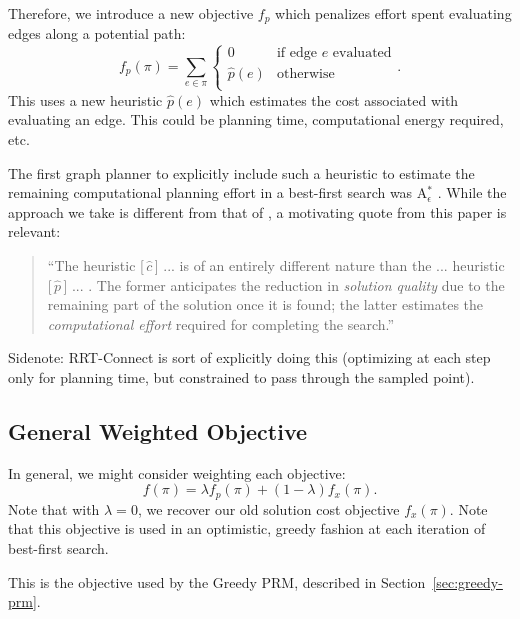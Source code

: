 \documentclass{report}
\begin{document}
Therefore, we introduce a new objective $f_p$
which penalizes effort spent evaluating edges along a potential path:
\begin{equation}
   f_p(\pi) = \sum_{e \in \pi} \left\{
   \begin{array}{cl}
      0 & \mbox{if edge } e \mbox{ evaluated}  \\
      \hat{p}(e) & \mbox{otherwise} \\
   \end{array}
   \right.
   .
\end{equation}
This uses a new heuristic $\hat{p}(e)$ which estimates the cost
associated with evaluating an edge.
This could be planning time, computational energy required, etc.

The first graph planner to explicitly include such a heuristic
to estimate the remaining
computational planning effort in a best-first search
was A$_\epsilon^*$ \cite{pearl1982semiadmissible}.
While the approach we take is different from that of
\cite{pearl1982semiadmissible},
a motivating quote from this paper is relevant:
\begin{quote}
``The heuristic [\,$\hat{c}$\,] ... is of an entirely
different nature than the ... heuristic [\,$\hat{p}$\,] ... .
The former anticipates the reduction in \emph{solution quality} due to the
remaining part of the solution once it is found;
the latter estimates the \emph{computational effort}
required for completing the search.''
\end{quote}

Sidenote: RRT-Connect is sort of explicitly doing this
(optimizing at each step only for planning time,
but constrained to pass through the sampled point).

\subsection{General Weighted Objective}

In general, we might consider weighting each objective:
\begin{equation}
   f(\pi) = \lambda f_p(\pi) + (1 - \lambda) f_x(\pi) .
   \label{eqn:general-objective}
\end{equation}
Note that with $\lambda=0$,
we recover our old solution cost objective $f_x(\pi)$.
Note that this objective is used in an optimistic, greedy fashion at each
iteration of best-first search.

This is the objective used by the Greedy PRM,
described in Section~\ref{sec:greedy-prm}.
\end{document}
